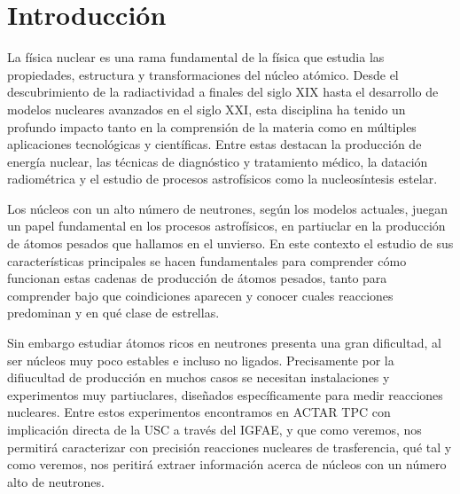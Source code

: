 

\section{Introducción}


La física nuclear es una rama fundamental de la física que estudia las propiedades, estructura y transformaciones del núcleo atómico. Desde el descubrimiento de la radiactividad a finales del siglo XIX hasta el desarrollo de modelos nucleares avanzados en el siglo XXI, esta disciplina ha tenido un profundo impacto tanto en la comprensión de la materia como en múltiples aplicaciones tecnológicas y científicas. Entre estas destacan la producción de energía nuclear, las técnicas de diagnóstico y tratamiento médico, la datación radiométrica y el estudio de procesos astrofísicos como la nucleosíntesis estelar.

Los núcleos con un alto número de neutrones, según los modelos actuales, juegan un papel fundamental en los procesos astrofísicos, en partiuclar en la producción de átomos pesados que hallamos en el unvierso. En este contexto el estudio de sus características principales se hacen fundamentales para comprender cómo funcionan estas cadenas de producción de átomos pesados, tanto para comprender bajo que coindiciones aparecen y conocer cuales reacciones predominan y en qué clase de estrellas.

Sin embargo estudiar átomos ricos en neutrones presenta una gran dificultad, al ser núcleos muy poco estables e incluso no ligados. Precisamente por la difiucultad de producción en muchos casos se necesitan instalaciones y experimentos muy partiuclares, diseñados específicamente para medir reacciones nucleares. Entre estos experimentos encontramos en ACTAR TPC con implicación directa de la USC a través del IGFAE, y que como veremos, nos permitirá caracterizar con precisión reacciones nucleares de trasferencia, qué tal y como veremos, nos peritirá extraer información acerca de núcleos con un número alto de neutrones. 

